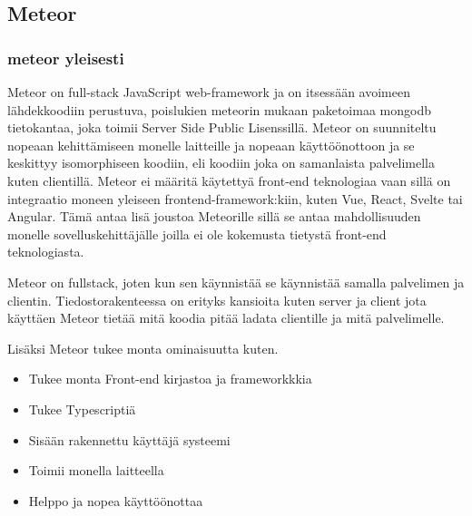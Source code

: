 \documentclass[11pt,a4paper,titlepage,oneside]{article}
\begin{document}
\newpage
\subsection{Meteor}                %



\subsubsection{meteor yleisesti}








Meteor on full-stack JavaScript web-framework ja on itsessään avoimeen lähdekkoodiin perustuva, 
poislukien meteorin mukaan paketoimaa mongodb tietokantaa, joka toimii Server Side Public Lisenssillä.
Meteor on suunniteltu nopeaan kehittämiseen monelle laitteille ja nopeaan käyttöönottoon ja se keskittyy isomorphiseen koodiin, 
eli koodiin joka on samanlaista palvelimella kuten clientillä.\citemissing
Meteor ei määritä käytettyä front-end teknologiaa vaan sillä on integraatio moneen yleiseen frontend-framework:kiin, kuten Vue, React, Svelte tai Angular.
Tämä antaa lisä joustoa Meteorille sillä se antaa mahdollisuuden monelle sovelluskehittäjälle joilla ei ole kokemusta tietystä front-end teknologiasta.



\medskip

Meteor on fullstack, joten kun sen käynnistää se käynnistää samalla palvelimen ja clientin.
Tiedostorakenteessa on erityks kansioita kuten server ja client jota käyttäen Meteor tietää mitä koodia pitää ladata clientille ja mitä palvelimelle.




\medskip

    

Lisäksi Meteor tukee monta ominaisuutta kuten. 
\begin{itemize}
    \item Tukee monta Front-end kirjastoa ja frameworkkkia
    \item Tukee Typescriptiä
    \item Sisään rakennettu käyttäjä systeemi
    \item Toimii monella laitteella
    \item Helppo ja nopea käyttöönottaa 
\end{itemize}
\medskip
\end{document}
